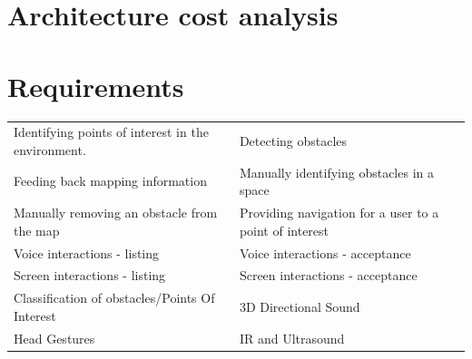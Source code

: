 \documentclass[prodmode,acmtosem]{acmsmall} %
\begin{document}
\section{Architecture cost analysis}
\label{ArchitectureCost}

\section{Requirements}
\begin{center}
\begin{tabularx}{\textwidth}{| X | X |} 
 \hline
 \rowcolor{lightgray}
 \multicolumn{2}{|c|}{List of Requirements} \\ [0.5ex] 
 \hline\hline
 Identifying points of interest in the environment. &  Detecting obstacles \\
 \hline
 Feeding back mapping information &  Manually identifying obstacles in a space \\
 \hline
 Manually removing an obstacle from the map &  Providing navigation for a user to a point of interest \\ 
 \hline
 Voice interactions - listing &  Voice interactions - acceptance \\ 
 \hline
 Screen interactions - listing &  Screen interactions - acceptance \\ 
 \hline
 Classification of obstacles/Points Of Interest &  3D Directional Sound \\ 
 \hline
 Head Gestures &  IR and Ultrasound \\  
 \hline

 \hline
\end{tabularx}
\label{tab:requirements}
\end{center}
\end{document}
